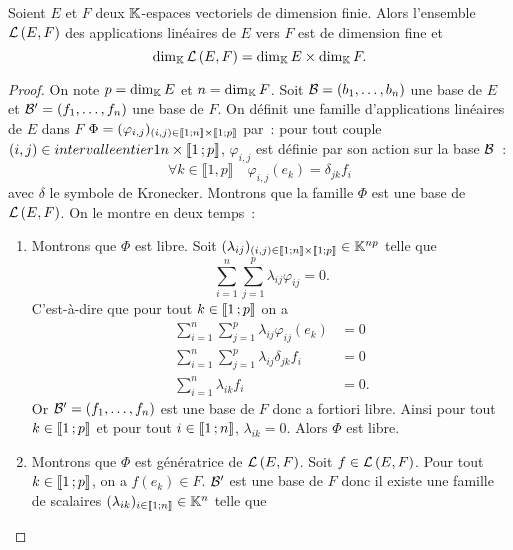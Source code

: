 \begin{theo}
  Soient $E$ et $F$ deux $\mathbb{K}$-espaces vectoriels de dimension finie. Alors l'ensemble $\mathcal{L}\left(E,F\right)$ des applications linéaires de $E$ vers $F$ est de dimension fine et
  \begin{equation}
    \operatorname{dim}_{\mathbb{K}} \mathcal{L}\left(E,F\right) = \operatorname{dim}_{\mathbb{K}} E \times \operatorname{dim}_{\mathbb{K}} F.
  \end{equation}
\end{theo}
\begin{proof}
  On note $p=\operatorname{dim}_{\mathbb{K}} E$ et $n=\operatorname{dim}_{\mathbb{K}} F$. Soit $\mathcal{B}=(b_1, \ldots, b_n)$ une base de $E$ et $\mathcal{B}'=(f_1, \ldots, f_n)$ une base de $F$. On définit une famille d'applications linéaires de $E$ dans $F$ $\Phi = (\varphi_{i,j})_{(i,j) \in \mathopen{\llbracket}1\mathclose{}\mathpunct{};n\mathclose{\rrbracket} \times \mathopen{\llbracket}1\mathclose{}\mathpunct{};p\mathclose{\rrbracket}}$ par~: pour tout couple $(i,j) \in intervalleentier{1}{n} \times \mathopen{\llbracket}1\mathclose{}\mathpunct{};p\mathclose{\rrbracket}$, $\varphi_{i,j}$ est définie par son action sur la base $\mathcal{B}$~:
  \begin{equation}
    \forall k \in \llbracket 1,p \rrbracket \quad \varphi_{i,j}(e_k)= \delta_{jk} f_i
  \end{equation}
  avec $\delta$ le symbole de Kronecker. Montrons que la famille $\Phi$ est une base de $\mathcal{L}\left(E,F\right)$. On le montre en deux temps~:
  \begin{enumerate}
  \item Montrons que $\Phi$ est libre. Soit $(\lambda_{ij})_{(i,j) \in \mathopen{\llbracket}1\mathclose{}\mathpunct{};n\mathclose{\rrbracket} \times \mathopen{\llbracket}1\mathclose{}\mathpunct{};p\mathclose{\rrbracket}} \in \mathbb{K}^{np}$ telle que
    \begin{equation}
      \sum_{i=1}^n \sum_{j=1}^p \lambda_{ij} \varphi_{ij} =0.
    \end{equation}
    C'est-à-dire que pour tout $k \in \mathopen{\llbracket}1\mathclose{}\mathpunct{};p\mathclose{\rrbracket}$ on a
    \begin{align}
      \sum_{i=1}^n \sum_{j=1}^p \lambda_{ij} \varphi_{ij}(e_k) &=0\\
      \sum_{i=1}^n \sum_{j=1}^p \lambda_{ij} \delta_{jk} f_i &=0\\
      \sum_{i=1}^n \lambda_{ik} f_i &=0.
    \end{align}
    Or $\mathcal{B}'=(f_1, \ldots, f_n)$ est une base de $F$ donc a fortiori libre. Ainsi pour tout $k \in \mathopen{\llbracket}1\mathclose{}\mathpunct{};p\mathclose{\rrbracket}$ et pour tout $i \in \mathopen{\llbracket}1\mathclose{}\mathpunct{};n\mathclose{\rrbracket}$, $\lambda_{ik}=0$. Alors $\Phi$ est libre.
  \item  Montrons que $\Phi$ est génératrice de $\mathcal{L}\left(E,F\right)$. Soit $f \in \mathcal{L}\left(E,F\right)$. Pour tout $k \in \mathopen{\llbracket}1\mathclose{}\mathpunct{};p\mathclose{\rrbracket}$, on a $f(e_k) \in F$. $\mathcal{B}'$ est une base de $F$ donc il existe une famille de scalaires $(\lambda_{ik})_{i \in  \mathopen{\llbracket}1\mathclose{}\mathpunct{};n\mathclose{\rrbracket}} \in \mathbb{K}^n$ telle que

\end{enumerate}
\end{proof}
